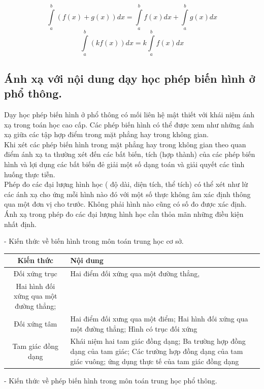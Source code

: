 \documentclass[12pt,oneside,a4paper,reqno]{book}
\begin{document}
$$\int\limits_a^b {(f(x) + g(x))dx}  = \int\limits_a^b {f(x)dx}  + \int\limits_a^b {g(x)dx} $$
$$\int\limits_a^b {(kf(x))dx = k\int\limits_a^b {f(x)dx} } $$


\subsection{Ánh xạ với nội dung dạy học phép biến hình ở phổ thông.}
 \medskip
 
   
       Dạy học phép biến hình ở phổ thông  có mối liên hệ mật thiết với khái niệm ánh xạ trong toán học cao cấp. Các phép biến hình có thể được xem như những ánh xạ giữa các tập hợp điểm trong mặt phẳng hay trong không gian.\\
\medskip
       Khi xét các phép biến hình trong mặt phẳng hay trong không gian theo quan điểm ánh xạ ta thường xét đến các bất biến, tích (hợp thành) của các phép biến hình và lợi dụng các bất biến đẻ giải một số dạng toán và giải quyết các tình huống thực tiễn.
\medskip  \\
       Phép đo các đại lượng hình học ( độ dài, diện tích, thể tích) có thể xét như lừ các ánh xạ cho ứng mỗi hình nào đó với một số thực không âm xác định thông qua một đơn vị cho trước. Không phải hình nào cũng có số đo được xác định. Ánh xạ trong phép đo các đại lượng hình học cần thỏa mãn những điều kiện nhất định.
       
-	Kiến thức về biến hình trong môn toán trung học cơ sở.


\begin{tabularx}{\textwidth}{|c|>{\raggedright}X|}
\hline
\textbf{Kiến thức } & \textbf{Nội dung} \tabularnewline
\hline
Đối xứng trục  & Hai điểm đối xứng qua một đường thẳng,   \\
   Hai hình đối xứng qua một đường thẳng; \tabularnewline
\hline
   Đối xứng tâm & Hai điểm đối xưng qua một điểm; Hai hình đối xứng qua một đường thẳng; Hình có trục đối xứng   \tabularnewline 
   \hline
   Tam giác đồng dạng& Khái niệm hai tam giác đồng dạng; Ba trường hợp đồng dạng của tam giác;    Các trường hợp đồng dạng của tam giác vuông;
   ứng dụng thực tế của tam giác đồng dạng\tabularnewline

\hline
\end{tabularx}

-	Kiến thức về phép biến hình trong môn toán trung học phổ thông.
\end{document}
